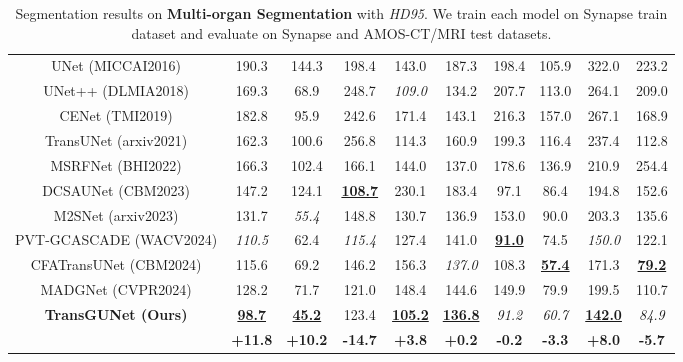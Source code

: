 \begin{table*}
\begin{tabular}{c|c|cccccccc}
    \hline
    UNet \tiny{(MICCAI2016)}     & 190.3 & 144.3 & 198.4 & 143.0 & 187.3 & 198.4 & 105.9 & 322.0 & 223.2 \\
    UNet++ \tiny{(DLMIA2018)}    & 169.3 & 68.9 & 248.7 & \textit{109.0} & 134.2 & 207.7 & 113.0 & 264.1 & 209.0 \\
    CENet \tiny{(TMI2019)}       & 182.8 & 95.9 & 242.6 & 171.4 & 143.1 & 216.3 & 157.0 & 267.1 & 168.9 \\
    TransUNet \tiny{(arxiv2021)} & 162.3 & 100.6 & 256.8 & 114.3 & 160.9 & 199.3 & 116.4 & 237.4 & 112.8 \\
    MSRFNet \tiny{(BHI2022)}     & 166.3 & 102.4 & 166.1 & 144.0 & 137.0 & 178.6 & 136.9 & 210.9 & 254.4 \\
    DCSAUNet \tiny{(CBM2023)}    & 147.2 & 124.1 & \textbf{\underline{108.7}} & 230.1 & 183.4 & 97.1 & 86.4 & 194.8 & 152.6 \\
    M2SNet \tiny{(arxiv2023)}    & 131.7 & \textit{55.4} & 148.8 & 130.7 & 136.9 & 153.0 & 90.0 & 203.3 & 135.6 \\
    PVT-GCASCADE \tiny{(WACV2024)} & \textit{110.5} & 62.4 & \textit{115.4} & 127.4 & 141.0 & \textbf{\underline{91.0}} & 74.5 & \textit{150.0} & 122.1 \\
    CFATransUNet \tiny{(CBM2024)} & 115.6 & 69.2 & 146.2 & 156.3 & \textit{137.0} & 108.3 & \textbf{\underline{57.4}} & 171.3 & \textbf{\underline{79.2}} \\
    MADGNet \tiny{(CVPR2024)}    & 128.2 & 71.7 & 121.0 & 148.4 & 144.6 & 149.9 & 79.9 & 199.5 & 110.7 \\
    \hline
    \multicolumn{1}{c|}{\multirow{2}{*}{\textbf{TransGUNet \tiny{(Ours)}}}} & \textbf{\underline{98.7}} & \textbf{\underline{45.2}} & 123.4 & \textbf{\underline{105.2}} & \textbf{\underline{136.8}} & \textit{91.2} & \textit{60.7} & \textbf{\underline{142.0}} & \textit{84.9} \\ \cline{2-10}
    & \textbf{+11.8} & \textbf{+10.2} & \textbf{-14.7} & \textbf{+3.8} & \textbf{+0.2} & \textbf{-0.2} & \textbf{-3.3} & \textbf{+8.0} & \textbf{-5.7} \\
    \hline
    \end{tabular}
    \caption{Segmentation results on \textbf{Multi-organ Segmentation} with \textit{HD95}. We train each model on Synapse \cite{Synapse_dataset} train dataset and evaluate on Synapse \cite{Synapse_dataset} and AMOS-CT/MRI \cite{ji2022amos} test datasets.}
    \label{tab:comparison_sota_multiorgan_HD95_metrics}
\end{table*}

